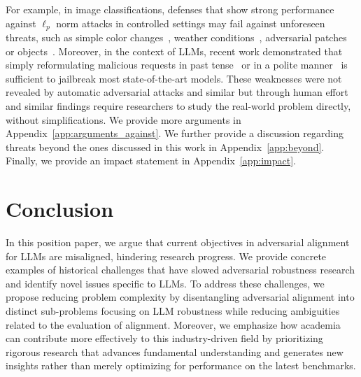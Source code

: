 For example, in image classifications, defenses that show strong performance against $\ell_p$ norm attacks in controlled settings may fail against unforeseen threats, such as simple color changes~\cite{laidlaw2019functional}, weather conditions~\cite{kaufmann2019testing}, adversarial patches or objects~\cite{song2018physical, athalye2018synthesizing}. Moreover, in the context of LLMs, recent work demonstrated that simply reformulating malicious requests in past tense~\cite{andriushchenko2024does} or in a polite manner~\cite{xhonneux2024efficient} is sufficient to jailbreak most state-of-the-art models. These weaknesses were not revealed by automatic adversarial attacks and similar but through human effort and similar findings require researchers to study the real-world problem directly, without simplifications. We provide more arguments in Appendix~\ref{app:arguments_against}. We further provide a discussion regarding threats beyond the ones discussed in this work in Appendix~\ref{app:beyond}. Finally, we provide an impact statement in Appendix~\ref{app:impact}.

\vspace{-5pt}
\section{Conclusion}


In this position paper, we argue that current objectives in adversarial alignment for LLMs are misaligned, hindering research progress.
We provide concrete examples of historical challenges that have slowed adversarial robustness research and identify novel issues specific to LLMs. To address these challenges, we propose reducing problem complexity by disentangling adversarial alignment into distinct sub-problems focusing on LLM robustness while reducing ambiguities related to the evaluation of alignment.
Moreover, we emphasize how academia can contribute more effectively to this industry-driven field by prioritizing rigorous research that advances fundamental understanding and generates new insights rather than merely optimizing for performance on the latest benchmarks. 

\clearpage

%
